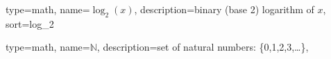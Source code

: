 \newcommand{\Axor}{A_\textnormal{{xor}}} %
\newcommand{\Aand}{A_\textnormal{{and}}} %
\newcommand{\Amux}{A_\textnormal{{mux}}} %
\newcommand{\Aff}{A_\textnormal{{ff}}} %
\newcommand{\Txor}{T_\textnormal{{xor}}} %
\newcommand{\Tand}{T_\textnormal{{and}}} %
\newcommand{\Tmux}{T_\textnormal{{mux}}} %
\newcommand{\ldceil}[1]{\lceil\log_2{\left({#1}\right)}\rceil}
\newcommand{\T}{{{S}}}
\newcommand{\cf}{{\delta}}
\newcommand{\PerM}{\mathbf{I}_\pi} %
\newcommand{\AssM}{\mathbf{I}_\sigma} %
\newcommand{\AssOpt}{\mathbf{{I}_{\sigma,\textnormal{power-opt}}}} %
\newcommand{\PerMCacOpt}{\mathbf{I}_{\pi,\textnormal{perf-opt}}}  %
\newcommand{\PerMTCOpt}{\mathbf{I}_{\pi,\textnormal{$\mathit{TC}$-opt}}} %

\newcommand{\meanP}{\bar{p}}



{ type=math, 
	name={\ensuremath{\log_2(x)}},
	description={binary (base 2) logarithm of $x$},
	sort={log_2}
}




{ type=math, 
	name={\ensuremath{\mathbb{N}}},
	description={set of  natural numbers: \{0,1,2,3,\dots \}},
}



